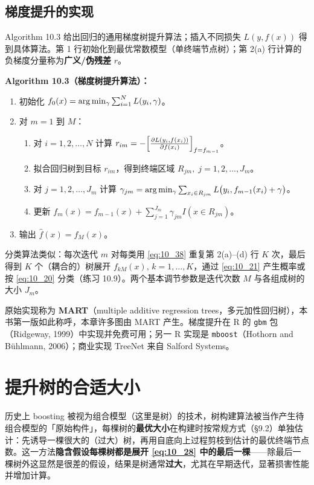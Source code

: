\subsection{梯度提升的实现}

Algorithm 10.3 给出回归的通用梯度树提升算法；插入不同损失 $L(y, f(x))$ 得到具体算法。第 1 行初始化到最优常数模型（单终端节点树）；第 2(a) 行计算的负梯度分量称为\textbf{广义/伪残差} $r$。

\textbf{Algorithm 10.3（梯度树提升算法）：}
\begin{enumerate}
    \item 初始化 $f_0(x) = \arg\min_{\gamma} \sum_{i=1}^{N} L(y_i, \gamma)$。
    \item 对 $m = 1$ 到 $M$：
    \begin{enumerate}
        \item 对 $i = 1, 2, \ldots, N$ 计算 $r_{im} = -\Bigl[\frac{\partial L(y_i, f(x_i))}{\partial f(x_i)}\Bigr]_{f = f_{m-1}}$。
        \item 拟合回归树到目标 $r_{im}$，得到终端区域 $R_{jm},\; j = 1, 2, \ldots, J_m$。
        \item 对 $j = 1, 2, \ldots, J_m$ 计算 $\gamma_{jm} = \arg\min_{\gamma} \sum_{x_i \in R_{jm}} L\bigl(y_i, f_{m-1}(x_i) + \gamma\bigr)$。
        \item 更新 $f_m(x) = f_{m-1}(x) + \sum_{j=1}^{J_m} \gamma_{jm} I(x \in R_{jm})$。
    \end{enumerate}
    \item 输出 $\hat f(x) = f_M(x)$。
\end{enumerate}

分类算法类似：每次迭代 $m$ 对每类用 \eqref{eq:10_38} 重复第 2(a)--(d) 行 $K$ 次，最后得到 $K$ 个（耦合的）树展开 $f_{kM}(x),\, k = 1, \ldots, K$，通过 \eqref{eq:10_21} 产生概率或按 \eqref{eq:10_20} 分类（练习 10.9）。两个基本调节参数是迭代次数 $M$ 与各组成树的大小 $J_m$。

原始实现称为 \textbf{MART}（multiple additive regression trees，多元加性回归树），本书第一版如此称呼，本章许多图由 MART 产生。梯度提升在 R 的 \texttt{gbm} 包（Ridgeway, 1999）中实现并免费可用；另一 R 实现是 \texttt{mboost}（Hothorn and Bühlmann, 2006）；商业实现 TreeNet 来自 Salford Systems。

\section{提升树的合适大小}

历史上 boosting 被视为组合模型（这里是树）的技术，树构建算法被当作产生待组合模型的「原始构件」，每棵树的\textbf{最优大小}在构建时按常规方式（§9.2）单独估计：先诱导一棵很大的（过大）树，再用自底向上过程剪枝到估计的最优终端节点数。这一方法\textbf{隐含假设每棵树都是展开 \eqref{eq:10_28} 中的最后一棵}——除最后一棵树外这显然是很差的假设，结果是树通常\textbf{过大}，尤其在早期迭代，显著损害性能并增加计算。

